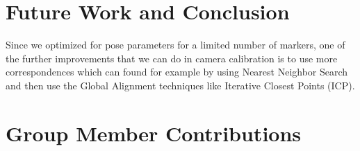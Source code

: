 \documentclass[10pt,twocolumn,letterpaper]{article}
\begin{document}
\section{Future Work and Conclusion}
Since we optimized for pose parameters for a limited number of markers, one of the further improvements that we can do in camera calibration is to use more correspondences which can found for example by using Nearest Neighbor Search and then use the Global Alignment techniques like Iterative Closest Points (ICP).

\section{Group Member Contributions}

{\small


}
\end{document}
